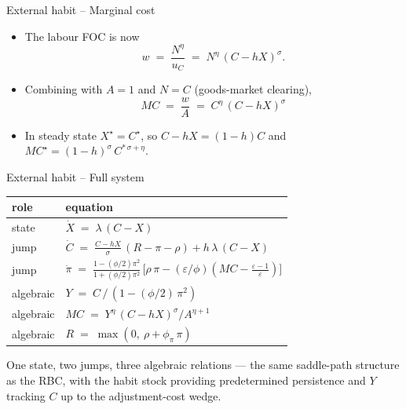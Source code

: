 \documentclass[11pt,aspectratio=169]{beamer}
\begin{document}
\begin{frame}{External habit -- Marginal cost}

\begin{itemize}

\item The labour FOC is now
  \[
  w \;=\; \frac{N^\eta}{u_C} \;=\; N^\eta\,(C - hX)^\sigma.
  \]

\item Combining with $A=1$ and $N=C$ (goods-market clearing),
  \[
  \boxed{MC \;=\; \frac{w}{A} \;=\; C^\eta\,(C - hX)^\sigma}
  \]

\item In steady state $X^\star = C^\star$, so $C - hX = (1-h)C$ and
  $MC^\star = (1-h)^\sigma\,C^{*\,\sigma+\eta}$.

\end{itemize}

\end{frame}

\begin{frame}{External habit -- Full system}

\begin{center}
\small
\renewcommand{\arraystretch}{1.4}
\begin{tabular}{ll}
\toprule
role & equation \\
\midrule
state      & $\dot X \;=\; \lambda\,(C - X)$ \\
jump       & $\dot C \;=\; \tfrac{C - hX}{\sigma}\,(R - \pi - \rho)
              + h\,\lambda\,(C - X)$ \\
jump       & $\dot\pi \;=\; \frac{1-(\phi/2)\pi^2}{1+(\phi/2)\pi^2}\,
              \bigl[\rho\,\pi - (\varepsilon/\phi)(MC - \tfrac{\varepsilon-1}{\varepsilon})\bigr]$ \\
algebraic  & $Y \;=\; C\,/\,(1 - (\phi/2)\,\pi^2)$ \\
algebraic  & $MC \;=\; Y^\eta\,(C - hX)^\sigma / A^{\eta+1}$ \\
algebraic  & $R \;=\; \max(0,\ \rho + \phi_\pi\,\pi)$ \\
\bottomrule
\end{tabular}
\end{center}

\medskip

One state, two jumps, three algebraic relations — the same saddle-path
structure as the RBC, with the habit stock providing predetermined
persistence and $Y$ tracking $C$ up to the adjustment-cost wedge.

\end{frame}
\end{document}

